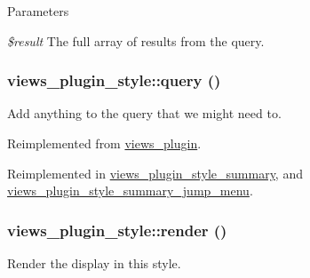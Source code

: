 \begin{DoxyParams}{Parameters}
\item[{\em \$result}]The full array of results from the query. \end{DoxyParams}
\hypertarget{classviews__plugin__style_af6b601d8f42cc3d86721fcad76eaae4b}{
\subsubsection[{query}]{\setlength{\rightskip}{0pt plus 5cm}views\_\-plugin\_\-style::query ()}}
\label{classviews__plugin__style_af6b601d8f42cc3d86721fcad76eaae4b}
Add anything to the query that we might need to. 

Reimplemented from \hyperlink{classviews__plugin_a10ac07c47c4a8735786f9fcc38548587}{views\_\-plugin}.

Reimplemented in \hyperlink{classviews__plugin__style__summary_afd8f02a61bd0e1887cc7767950e8e0df}{views\_\-plugin\_\-style\_\-summary}, and \hyperlink{classviews__plugin__style__summary__jump__menu_aee2a45ee02a7ce8d041a5b028758cf0b}{views\_\-plugin\_\-style\_\-summary\_\-jump\_\-menu}.\hypertarget{classviews__plugin__style_aa52b618e91b11a7d10ad1feadbc891f1}{
\subsubsection[{render}]{\setlength{\rightskip}{0pt plus 5cm}views\_\-plugin\_\-style::render ()}}
\label{classviews__plugin__style_aa52b618e91b11a7d10ad1feadbc891f1}
Render the display in this style. 

